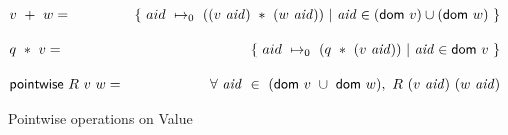 \begin{figure*}[t!]
  \begin{align*}
    & v~+~w =& \{~ aid~\mapsto_0 ~((v~\var{aid})~*~(w~\var{aid})) ~\vert~ \var{aid} \in (\fun{dom}~v)\cup(\fun{dom}~w) ~\}
    \nextdef
    & q~*~v =& \{~ aid~\mapsto_0 ~(q~*~(v~\var{aid})) ~\vert~ \var{aid} \in \fun{dom}~v~\}
    \nextdef
    & \fun{pointwise}~R~v~w =& \forall~\var{aid} ~\in ~(\fun{dom}~v~\cup~\fun{dom}~w),~R~(v~\var{aid})~(w~\var{aid})
  \end{align*}
  \caption{Pointwise operations on Value}
  \label{fig:pointwise}
\end{figure*}
